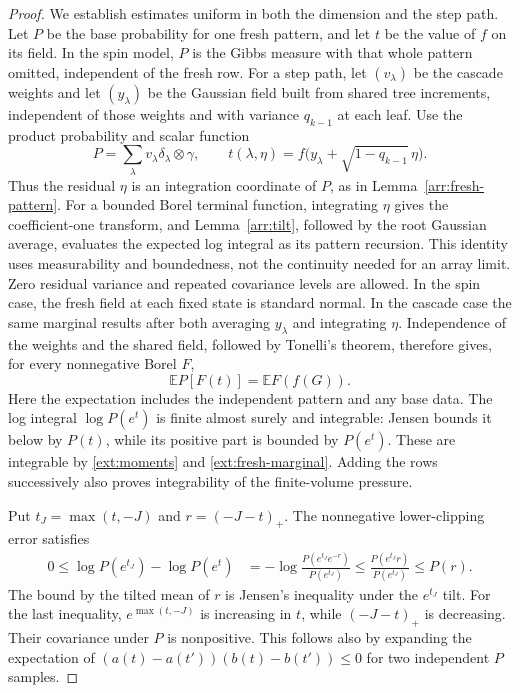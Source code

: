 \begin{proof}
We establish estimates uniform in both the dimension and the step path.
Let $P$ be the base probability for one fresh pattern, and let $t$ be
the value of $f$ on its field. In the spin model, $P$ is the Gibbs
measure with that whole pattern omitted, independent of the fresh row.
For a step path, let $(v_\lambda)$ be the cascade weights and let
$(y_\lambda)$ be the Gaussian field built from shared tree increments,
independent of those weights and with variance $q_{k-1}$ at each leaf.
Use the product probability and scalar function
\[
 P=\sum_\lambda v_\lambda\delta_\lambda\otimes\gamma,
 \qquad
 t(\lambda,\eta)=f\bigl(y_\lambda+\sqrt{1-q_{k-1}}\,\eta\bigr).
\]
Thus the residual $\eta$ is an integration coordinate of $P$, as in
Lemma~\ref{arr:fresh-pattern}. For a bounded Borel terminal function,
integrating $\eta$ gives the coefficient-one transform, and
Lemma~\ref{arr:tilt}, followed by the root Gaussian average, evaluates
the expected log integral as its pattern recursion.
This identity uses measurability and boundedness,
not the continuity needed for an array limit. Zero residual variance
and repeated covariance levels are allowed.
In the spin case, the fresh field at
each fixed state is standard normal. In the cascade case the same
marginal results after both averaging $y_\lambda$ and integrating
$\eta$. Independence of the weights and the shared field, followed by
Tonelli's theorem, therefore gives, for every nonnegative Borel $F$,
\begin{equation}\label{ext:fresh-marginal}
 \mathbb E P[F(t)]=\mathbb E F(f(G)).
\end{equation}
Here the expectation includes the independent pattern and any base data.
The log integral $\log P(e^t)$ is finite almost surely and integrable:
Jensen bounds it below by $P(t)$, while its positive part is bounded by
$P(e^t)$. These are integrable by \eqref{ext:moments} and
\eqref{ext:fresh-marginal}. Adding the rows successively also proves
integrability of the finite-volume pressure.

Put $t_J=\max(t,-J)$ and $r=(-J-t)_+$. The nonnegative lower-clipping
error satisfies
\begin{align}
 0\le \log P(e^{t_J})-\log P(e^t)
 &=-\log\frac{P(e^{t_J}e^{-r})}{P(e^{t_J})}
 \le\frac{P(e^{t_J}r)}{P(e^{t_J})}
 \le P(r).\label{ext:lower-clip}
\end{align}
The bound by the tilted mean of $r$ is Jensen's inequality under the
$e^{t_J}$ tilt. For the last inequality, $e^{\max(t,-J)}$ is increasing in
$t$, while $(-J-t)_+$ is decreasing. Their covariance under $P$ is
nonpositive. This follows also by expanding the expectation of
$(a(t)-a(t'))(b(t)-b(t'))\le0$ for two independent $P$ samples.


\end{proof}
